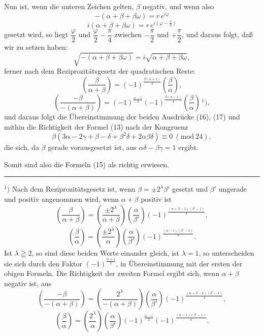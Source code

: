 Nun ist, wenn die unteren Zeichen gelten, $\beta$ negativ, und
wenn also
\[
-(\alpha+\beta+\beta\omega) = r\,e^{i\varphi}
\]
\[
i(\alpha+\beta+\beta\omega) = r\,e^{i\left(\varphi-\frac{\pi}{2}\right)}
\]
gesetzt wird, so liegt $\dfrac{\varphi}{2}$ und $\dfrac{\varphi}{2}-\dfrac{\pi}{4}$ zwischen $-\dfrac{\pi}{2}$
und $+\dfrac{\pi}{2}$, und daraus folgt, daß wir zu setzen haben:
\[
\sqrt{-(\alpha+\beta+\beta\omega)} = i\sqrt{\alpha+\beta+\beta\omega},
\]
ferner nach dem Reziprozitätsgesetz der quadratischen Reste:
\[
\left(\frac{\beta}{\alpha+\beta}\right) = (-1)^{\frac{\beta(\alpha+1)}{4}}\left(\frac{\beta}{\alpha}\right),
\]
\[
\left(\frac{-\beta}{-(\alpha+\beta)}\right) = (-1)^{\frac{\alpha-1}{2}}(-1)^{\frac{\beta(\alpha-1)}{4}}\left(\frac{\beta}{\alpha}\right)\,^{1}),
\]
und daraus folgt die Übereinstimmung der beiden Ausdrücke
(16), (17) und mithin die Richtigkeit der Formel (13) nach der
Kongruenz
\[
\beta(3\alpha-2\gamma+\beta-\delta+\beta^2\delta+2\alpha\beta\delta) \equiv 0\ (\mathrm{mod}\ 24),
\]
die sich, da $\beta$ gerade vorausgesetzt ist, aus $\alpha\delta-\beta\gamma=1$ ergibt.

Somit sind also die Formeln (15) als richtig erwiesen.

\noindent\rule{4cm}{0.4pt}

\noindent $^{1})$ Nach dem Reziprozitätsgesetz ist, wenn $\beta=\pm2^\lambda\beta'$ gesetzt und $\beta'$
ungerade und positiv angenommen wird, wenn $\alpha+\beta$ positiv ist
\[
\left(\frac{\beta}{\alpha+\beta}\right) = \left(\frac{\pm2^\lambda}{\alpha+\beta}\right)\left(\frac{\alpha}{\beta'}\right)
(-1)^{\frac{(\alpha+\beta-1)(\beta'-1)}{4}},
\]
\[
\left(\frac{\beta}{\alpha}\right) = \left(\frac{\pm2^\lambda}{\alpha}\right)\left(\frac{\alpha}{\beta'}\right)
(-1)^{\frac{(\alpha-1)(\beta'-1)}{4}}.
\]
Ist $\lambda\geqq2$, so sind diese beiden Werte einander gleich, ist $\lambda=1$, so
unterscheiden sie sich durch den Faktor $(-1)^{\frac{\alpha+1}{2}}$, in Übereinstimmung
mit der ersten der obigen Formeln. Die Richtigkeit der zweiten Formel
ergibt sich, wenn $\alpha+\beta$ negativ ist, aus
\[
\left(\frac{-\beta}{-(\alpha+\beta)}\right) = \left(\frac{2^\lambda}{-(\alpha+\beta)}\right)\left(\frac{\alpha}{\beta'}\right)
(-1)^{\frac{(\alpha+\beta-1)(\beta'-1)}{4}},
\]
\[
\left(\frac{\beta}{\alpha}\right) = \left(\frac{2^\lambda}{\alpha}\right)\left(\frac{\alpha}{\beta'}\right)(-1)^{\frac{\alpha-1}{2}}
(-1)^{\frac{(\alpha-1)(\beta'-1)}{4}}.
\]
